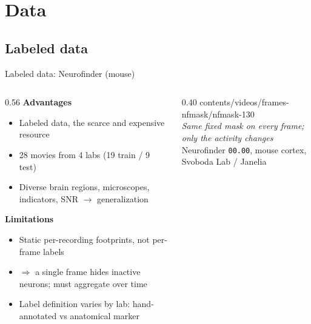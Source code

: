 \section{Data}
\subsection{Labeled data}

\begin{frame}[t]{Labeled data: Neurofinder (mouse)}
\begin{columns}[c]
\begin{column}{0.56\textwidth}
{\small\textbf{Advantages}}
{\small
\begin{itemize}\itemsep=0.25em
\item Labeled data, the scarce and expensive resource
\item 28 movies from 4 labs (19 train / 9 test) \cite{neurofinder}
\item Diverse brain regions, microscopes, indicators, SNR $\to$ generalization
\end{itemize}}
\medskip

{\small\textbf{Limitations}}
{\small
\begin{itemize}\itemsep=0.25em
\item Static per-recording footprints, not per-frame labels
\item $\Rightarrow$ a single frame hides inactive neurons; must aggregate over time
\item Label definition varies by lab: hand-annotated vs anatomical marker
\end{itemize}}
\end{column}
\hfill%
\begin{column}{0.40\textwidth}
\centering
{}%
{contents/videos/frames-nfmask/nfmask-}{1}{30}\\[0.3em]
{\small\itshape Same fixed mask on every frame; only the activity changes}\\[0.2em]
{\scriptsize Neurofinder \texttt{00.00}, mouse cortex, Svoboda Lab / Janelia
 \cite{peron2015barrel}}
\end{column}
\end{columns}
\end{frame}
